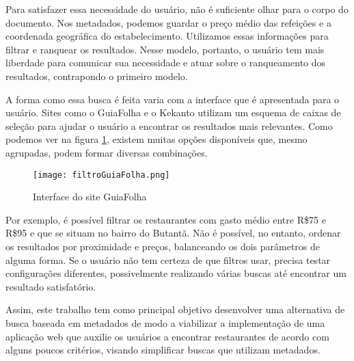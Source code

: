 Para satisfazer essa necessidade do usuário, não é suficiente olhar para o corpo do documento. Nos metadados, podemos guardar o preço médio das refeições e a coordenada geográfica do estabelecimento. Utilizamos essas informações para filtrar e ranquear os resultados. Nesse modelo, portanto, o usuário tem mais liberdade para comunicar sua necessidade e atuar sobre o ranqueamento dos resultados, contrapondo o primeiro modelo. 

A forma como essa busca é feita varia com a interface que é apresentada para o usuário. Sites como o GuiaFolha \cite{GuiaFolha} e o Kekanto \cite{Kekanto} utilizam um esquema de caixas de seleção para ajudar o usuário a encontrar os resultados mais relevantes. Como podemos ver na figura \ref{fig:interfguiafolha}, existem muitas opções disponíveis que, mesmo agrupadas, podem formar diversas combinações.

\begin{figure}[!h]
  \centering
  \texttt{[image: filtroGuiaFolha.png]} 
  \caption{Interface do site GuiaFolha \cite{GuiaFolha}}
  \label{fig:interfguiafolha} 
\end{figure}


Por exemplo, é possível filtrar os restaurantes com gasto médio entre R\$75 e R\$95 e que se situam no bairro do Butantã. Não é possível, no entanto, ordenar os resultados por proximidade e preços, balanceando os dois parâmetros de alguma forma. Se o usuário não tem certeza de que filtros usar, precisa testar configurações diferentes, possivelmente realizando várias buscas até encontrar um resultado satisfatório.

Assim, este trabalho tem como principal objetivo desenvolver uma alternativa de busca baseada em metadados de modo a viabilizar a implementação de uma aplicação web que auxilie os usuários a encontrar restaurantes de acordo com alguns poucos critérios, visando simplificar buscas que utilizam metadados.